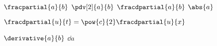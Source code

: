 %
%

$\fracpartial{a}{b}$
$\pdv[2]{a}{b}$
$\fracdpartial{a}{b}$
$\abs{a}$

$\fracdpartial{u}{t} = \pow{c}{2} \fracdpartial{u}{x}$

$\derivative{a}{b}$
$\dd{a}$ 

